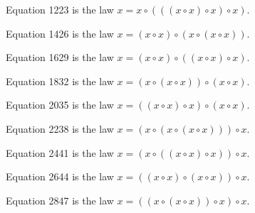 \begin{definition}[Equation 1223]\label{eq1223}\leanok{}  Equation 1223 is the law $x = x \circ (((x \circ x) \circ x) \circ x)$.
\end{definition}

\begin{definition}[Equation 1426]\label{eq1426}\leanok{}  Equation 1426 is the law $x = (x \circ x) \circ (x \circ (x \circ x))$.
\end{definition}

\begin{definition}[Equation 1629]\label{eq1629}\leanok{}  Equation 1629 is the law $x = (x \circ x) \circ ((x \circ x) \circ x)$.
\end{definition}

\begin{definition}[Equation 1832]\label{eq1832}\leanok{}  Equation 1832 is the law $x = (x \circ (x \circ x)) \circ (x \circ x)$.
\end{definition}

\begin{definition}[Equation 2035]\label{eq2035}\leanok{}  Equation 2035 is the law $x = ((x \circ x) \circ x) \circ (x \circ x)$.
\end{definition}

\begin{definition}[Equation 2238]\label{eq2238}\leanok{}  Equation 2238 is the law $x = (x \circ (x \circ (x \circ x))) \circ x$.
\end{definition}

\begin{definition}[Equation 2441]\label{eq2441}\leanok{}  Equation 2441 is the law $x = (x \circ ((x \circ x) \circ x)) \circ x$.
\end{definition}

\begin{definition}[Equation 2644]\label{eq2644}\leanok{}  Equation 2644 is the law $x = ((x \circ x) \circ (x \circ x)) \circ x$.
\end{definition}

\begin{definition}[Equation 2847]\label{eq2847}\leanok{}  Equation 2847 is the law $x = ((x \circ (x \circ x)) \circ x) \circ x$.
\end{definition}

